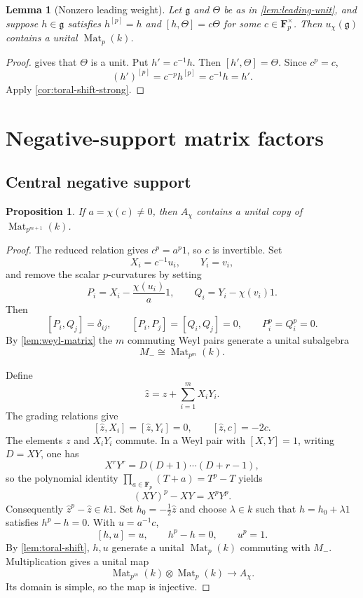 \documentclass[11pt,reqno]{amsart}
\newtheorem{proposition}[proposition]{Proposition}
\newtheorem{lemma}[lemma]{Lemma}
\theoremstyle{definition}
\theoremstyle{remark}
\theoremstyle{definition}
\newcommand{\Achi}{A_{\chi}}
\newcommand{\Mat}{\operatorname{Mat}}
\newcommand{\Fp}{\mathbf F_p}
\begin{document}
\begin{lemma}[Nonzero leading weight]\label{lem:leading-weight}
Let $\mathfrak g$ and $\Theta$ be as in \cref{lem:leading-unit}, and
suppose $h\in\mathfrak g$ satisfies $h^{[p]}=h$ and
$[h,\Theta]=c\Theta$ for some $c\in\Fp^\times$.  Then
$u_\chi(\mathfrak g)$ contains a unital $\Mat_p(k)$.
\end{lemma}

\begin{proof}
 gives that $\Theta$ is a unit.  Put
$h'=c^{-1}h$.  Then $[h',\Theta]=\Theta$.  Since $c^p=c$,
\[
 (h')^{[p]}=c^{-p}h^{[p]}=c^{-1}h=h'.
\]
Apply \cref{cor:toral-shift-strong}.
\end{proof}

\section{Negative-support matrix factors}\label{sec:negative}

\subsection{Central negative support}

\begin{proposition}\label{prop:central-negative}
If $a=\chi(c)\ne0$, then $\Achi$ contains a unital copy of
$\Mat_{p^{m+1}}(k)$.
\end{proposition}

\begin{proof}
The reduced relation gives $c^p=a^p1$, so $c$ is invertible.  Set
\[
 X_i=c^{-1}u_i,\qquad Y_i=v_i,
\]
and remove the scalar $p$-curvatures by setting
\[
 P_i=X_i-\frac{\chi(u_i)}a1,
 \qquad Q_i=Y_i-\chi(v_i)1.
\]
Then
\[
 [P_i,Q_j]=\delta_{ij},\qquad
 [P_i,P_j]=[Q_i,Q_j]=0,
 \qquad P_i^p=Q_i^p=0.
\]
By \cref{lem:weyl-matrix} the $m$ commuting Weyl pairs generate a unital
subalgebra
\[
 M_-\cong\Mat_{p^m}(k).
\]

Define
\[
 \widehat z=z+\sum_{i=1}^mX_iY_i.
\]
The grading relations give
\[
 [\widehat z,X_i]=[\widehat z,Y_i]=0,
 \qquad [\widehat z,c]=-2c.
\]
The elements $z$ and $X_iY_i$ commute.  In a Weyl pair with $[X,Y]=1$,
writing $D=XY$, one has
\[
 X^rY^r=D(D+1)\cdots(D+r-1),
\]
so the polynomial identity
$\prod_{a\in\Fp}(T+a)=T^p-T$ yields
\[
 (XY)^p-XY=X^pY^p.
\]
Consequently $\widehat z^p-\widehat z\in k1$.  Set
$h_0=-\frac12\widehat z$ and choose $\lambda\in k$ such that
$h=h_0+\lambda1$ satisfies $h^p-h=0$.  With $u=a^{-1}c$,
\[
 [h,u]=u,\qquad h^p-h=0,\qquad u^p=1.
\]
By \cref{lem:toral-shift}, $h,u$ generate a unital $\Mat_p(k)$ commuting
with $M_-$.  Multiplication gives a unital map
\[
 \Mat_{p^m}(k)\otimes\Mat_p(k)\longrightarrow\Achi.
\]
Its domain is simple, so the map is injective.
\end{proof}
\end{document}
